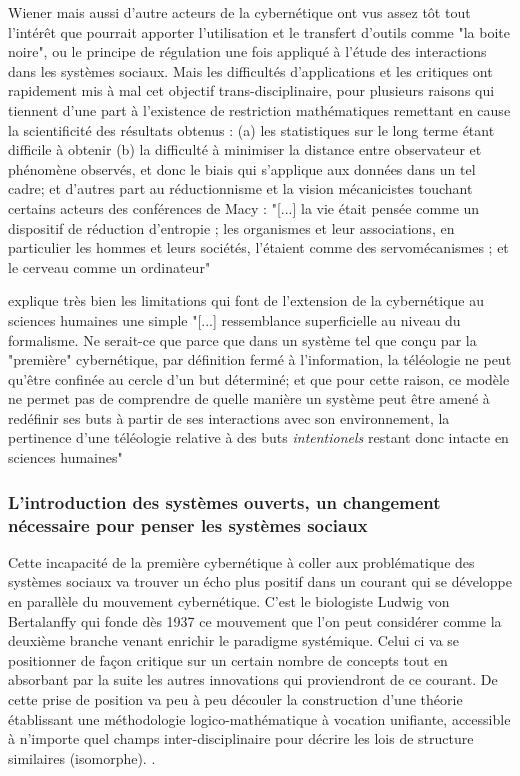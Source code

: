 Wiener mais aussi d'autre acteurs de la cybernétique ont vus assez tôt tout l'intérêt que pourrait apporter l'utilisation et le transfert d'outils comme "la boite noire", ou le principe de régulation une fois appliqué à l'étude des interactions dans les systèmes sociaux. Mais les difficultés d'applications et les critiques ont rapidement mis à mal cet objectif trans-disciplinaire, pour plusieurs raisons qui tiennent d'une part à l'existence de restriction mathématiques remettant en cause la scientificité des résultats obtenus : (a) les statistiques sur le long terme étant difficile à obtenir (b) la difficulté à minimiser la distance entre observateur et phénomène observés, et donc le biais qui s'applique aux données dans un tel cadre; et d'autres part au réductionnisme et la vision mécanicistes touchant certains acteurs des conférences de Macy  : "[...] la vie était pensée comme un dispositif de réduction d'entropie ; les organismes et leur associations, en particulier les hommes et leurs sociétés, l'étaient comme des servomécanismes ; et le cerveau comme un ordinateur" \autocite[784]{Pouvreau2013}

\autocite[782]{Pouvreau2013} explique très bien les limitations qui font  de l'extension de la cybernétique au sciences humaines une simple "[...] ressemblance superficielle au niveau du formalisme. Ne serait-ce que parce que dans un système tel que conçu par la "première" cybernétique, par définition fermé à l'information, la téléologie ne peut qu'être confinée au cercle d'un but déterminé; et que pour cette raison, ce modèle ne permet pas de comprendre de quelle manière un système peut être amené à redéfinir ses buts à partir de ses interactions avec son environnement, la pertinence d'une téléologie relative à des buts \textit{intentionels} restant donc intacte en sciences humaines" 

\subsubsection{L'introduction des systèmes ouverts, un changement nécessaire pour penser les systèmes sociaux}

Cette incapacité de la première cybernétique à coller aux problématique des systèmes sociaux va trouver un écho plus positif dans un courant qui se développe en parallèle du mouvement cybernétique. C'est le biologiste Ludwig von Bertalanffy qui fonde dès 1937 ce mouvement que l'on peut considérer comme la deuxième branche venant enrichir le paradigme systémique. Celui ci va se positionner de façon critique sur un certain nombre de concepts tout en absorbant par la suite les autres innovations qui proviendront de ce courant. De cette prise de position va peu à peu découler la construction d'une théorie établissant une méthodologie logico-mathématique à vocation unifiante, accessible à n'importe quel champs inter-disciplinaire pour décrire les lois de structure similaires (isomorphe). \autocite{LeMoigne2006a}. 

